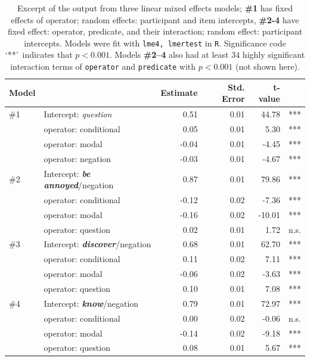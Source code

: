 \documentclass[11pt, a4paper]{article}
\begin{document}
\begin{table}[h]
	\centering
	\begin{tabular}{llrrrr}
		Model & & Estimate & Std. Error & t-value\\
		\midrule
		\#1 & Intercept: \emph{question} & 0.51 & 0.01 & 44.78 & ***\\
		& operator: conditional & 0.05 & 0.01 & 5.30 & ***\\
		& operator: modal & -0.04 & 0.01 & -4.45 & ***\\
		& operator: negation & -0.03 & 0.01 & -4.67 & ***\\
		\midrule
		\#2 & Intercept: \emph{\bf be annoyed}/negation & 0.87 & 0.01 & 79.86 & ***\\
		& operator: conditional & -0.12 & 0.02  & -7.36 & ***\\
		& operator: modal & -0.16 & 0.02  & -10.01 & ***\\
		& operator: question & 0.02 & 0.01 & 1.72 & n.s.\\
		\midrule
		\#3 & Intercept: \emph{\bf discover}/negation & 0.68 & 0.01 & 62.70 & ***\\
		& operator: conditional & 0.11 & 0.02 & 7.11 & ***\\
		& operator: modal & -0.06 & 0.02 & -3.63 & ***\\
		& operator: question & 0.10 & 0.01 & 7.08 & ***\\
		\midrule
		\#4 & Intercept: \emph{\bf know}/negation & 0.79 & 0.01 & 72.97 & ***\\
		& operator: conditional & 0.00 & 0.02 & -0.06 & n.s.\\
		& operator: modal & -0.14 & 0.02 & -9.18 & ***\\
		& operator: question & 0.08 & 0.01 & 5.67 & ***\\
		\bottomrule
	\end{tabular}
	\caption{\small Excerpt of the output from three linear mixed effects models; \textbf{\#1} has fixed effects of operator; random effects: participant and item intercepts, \textbf{\#2-4} have fixed effect: operator, predicate, and their interaction; random effect: participant intercepts.
		Models were fit with \texttt{lme4, lmertest} in \texttt{R}. Significance code \lq***\rq\ indicates that $p < 0.001$.
		Models \textbf{\#2--4} also had at least $34$ highly significant interaction terms of \texttt{operator} and \texttt{predicate} with $p < 0.001$ (not shown here).}\label{t:models}
\end{table}
\end{document}
